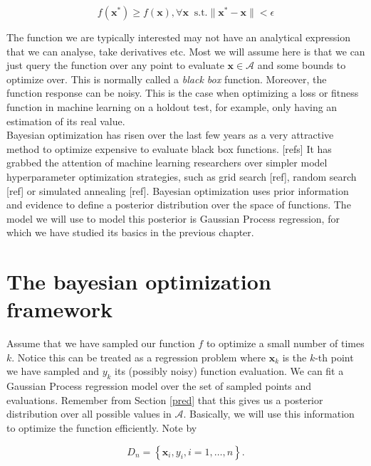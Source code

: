 \documentclass[10pt,a4paper,twoside]{book}
\begin{document}
\begin{equation}
f(\boldsymbol{x}^*) \geq f(\boldsymbol{x}), \forall \boldsymbol{x}\;\; \mathrm{s.t.} \rVert \boldsymbol{x}^* - \boldsymbol{x} \lVert < \epsilon
\end{equation}

The function we are typically interested may not have an analytical expression that we can analyse, take derivatives etc. Most we will assume here is that we can just query the function over any point to evaluate $\boldsymbol{x}\in\mathcal{A}$ and some bounds to optimize over. This is normally called a \textit{black box} function. Moreover, the function response can be noisy. This is the case when optimizing a loss or fitness function in machine learning on a holdout test, for example, only having an estimation of its real value.\\ 

Bayesian optimization has risen over the last few years as a very attractive method to optimize expensive to evaluate black box functions. [refs] It has grabbed the attention of machine learning researchers over simpler model hyperparameter optimization strategies, such as grid search [ref], random search [ref] or simulated annealing [ref]. Bayesian optimization uses prior information and evidence to define a posterior distribution over the space of functions. The model we will use to model this posterior is Gaussian Process regression, for which we have studied its basics in the previous chapter.


\section{The bayesian optimization framework}

Assume that we have sampled our function $f$ to optimize a small number of times $k$. Notice this can be treated as a regression problem where $\boldsymbol{x}_k$ is the $k$-th point we have sampled and $y_k$ its (possibly noisy) function evaluation. We can fit a Gaussian Process regression model over the set of sampled points and evaluations. Remember from Section \ref{pred} that this gives us a posterior distribution over all possible values in $\mathcal{A}$. Basically, we will use this information to optimize the function efficiently. Note by

\begin{equation}
D_n = \left\lbrace \boldsymbol{x}_i, y_i, i=1,\dots,n\right\rbrace.
\end{equation}
\end{document}
